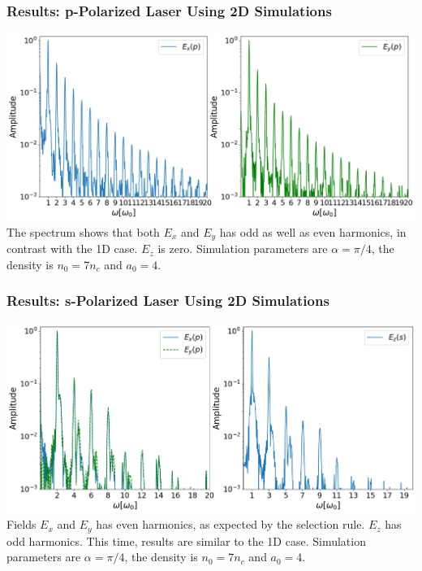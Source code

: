\documentclass{beamer}
\begin{document}
\begin{frame}
    \frametitle{Results: p-Polarized Laser Using 2D Simulations}
    \centering
    \includegraphics[width=1\textwidth]{images/p2d.png}
    \scriptsize{The spectrum shows that both $E_x$ and $E_y$ has odd as well as even harmonics, in contrast with the 1D case. $E_z$ is zero. Simulation parameters are $\alpha = \pi/4$, the density is $n_0 = 7n_c$ and $a_0 = 4$.}
    \label{fig:p2d}
\end{frame}

\begin{frame}
    \frametitle{Results: s-Polarized Laser Using 2D Simulations}
    \centering
    \includegraphics[width=1\textwidth]{images/s2d.png}
    \scriptsize{Fields $E_x$ and $E_y$ has even harmonics, as expected by the selection rule. $E_z$ has odd harmonics. This time, results are similar to the 1D case. Simulation parameters are $\alpha = \pi/4$, the density is $n_0 = 7n_c$ and $a_0 = 4$.}
    \label{fig:s2d}
\end{frame}
\end{document}
